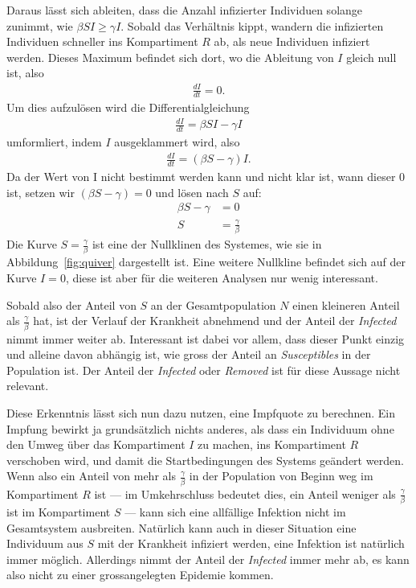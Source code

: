 \begin{refsection}
Daraus lässt sich ableiten, dass die Anzahl infizierter Individuen solange zunimmt, wie $\beta S I \ge \gamma I$. Sobald das Verhältnis kippt, wandern die infizierten Individuen schneller ins Kompartiment $R$ ab, als neue Individuen infiziert werden.
Dieses Maximum befindet sich dort, wo die Ableitung von $I$ gleich null ist, also
\begin{align*}
  \frac{dI}{dt} = 0.
\end{align*}
Um dies aufzulösen wird die Differentialgleichung 
\begin{align*}
  \frac{dI}{dt} = \beta S I - \gamma I
\end{align*}
umformliert, indem $I$ ausgeklammert wird, also
\begin{align*}
  \frac{dI}{dt} = \left(\beta S - \gamma \right) I.
\end{align*}
Da der Wert von I nicht bestimmt werden kann und nicht klar ist, wann dieser 0 ist, setzen wir $\left(\beta S - \gamma \right) = 0$ und lösen nach $S$ auf:
\begin{align*}
  \beta S - \gamma &= 0 \\
  S &= \frac{\gamma}{\beta}
\end{align*}
Die Kurve $S = \frac{\gamma}{\beta}$ ist eine der Nullklinen des Systemes, wie sie in Abbildung~\ref{fig:quiver} dargestellt ist. Eine weitere Nullkline befindet sich auf der Kurve $I = 0$, diese ist aber für die weiteren Analysen nur wenig interessant.


Sobald also der Anteil von $S$ an der Gesamtpopulation $N$ einen kleineren Anteil als $\frac{\gamma}{\beta}$ hat, ist der Verlauf der Krankheit abnehmend und der Anteil der \emph{Infected} nimmt immer weiter ab.
Interessant ist dabei vor allem, dass dieser Punkt einzig und alleine davon abhängig ist, wie gross der Anteil an \emph{Susceptibles} in der Population ist. 
Der Anteil der \emph{Infected} oder \emph{Removed} ist für diese Aussage nicht relevant. 

Diese Erkenntnis lässt sich nun dazu nutzen, eine Impfquote zu berechnen. 
Ein Impfung bewirkt ja grundsätzlich nichts anderes, als dass ein Individuum ohne den Umweg über das Kompartiment $I$ zu machen, ins Kompartiment $R$ verschoben wird, und damit die Startbedingungen des Systems geändert werden.
Wenn also ein Anteil von mehr als $\frac{\gamma}{\beta}$ in der Population von Beginn weg im Kompartiment $R$ ist --- im Umkehrschluss bedeutet dies, ein Anteil weniger als $\frac{\gamma}{\beta}$ ist im Kompartiment $S$ --- kann sich eine allfällige Infektion nicht im Gesamtsystem ausbreiten.
Natürlich kann auch in dieser Situation eine Individuum aus $S$ mit der Krankheit infiziert werden, eine Infektion ist natürlich immer möglich. 
Allerdings nimmt der Anteil der \emph{Infected} immer mehr ab, es kann also nicht zu einer grossangelegten Epidemie kommen.


\end{refsection}
